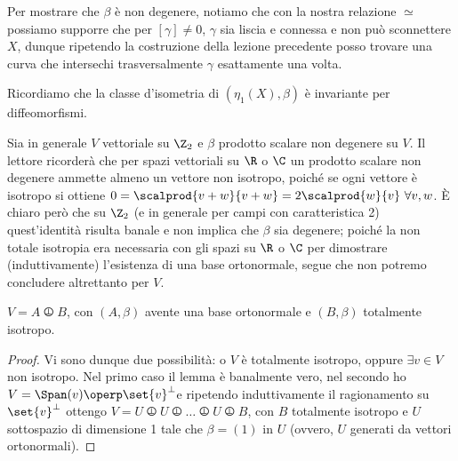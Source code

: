 Per mostrare che $\beta$ è non degenere, notiamo che con la nostra relazione $\simeq$ possiamo supporre che per $[\gamma] \neq 0$, $\gamma$ sia liscia e connessa e non può sconnettere $X$, dunque ripetendo la costruzione della lezione precedente posso trovare una curva che intersechi trasversalmente $\gamma$ esattamente una volta.


Ricordiamo che la classe d'isometria di $(\eta_1(X), \beta)$ è invariante per diffeomorfismi.

Sia in generale $V$ vettoriale su $\Z_2$ e $\beta$ prodotto scalare non degenere su $V$. Il lettore ricorderà che per spazi vettoriali su $\R$ o $\C$ un prodotto scalare non degenere ammette almeno un vettore non isotropo, poiché se ogni vettore è isotropo si ottiene $0 = \scalprod{v+w}{v+w} = 2\scalprod{w}{v} \ \forall v,w$. È chiaro però che su $\Z_2$ (e in generale per campi con caratteristica 2) quest'identità risulta banale e non implica che $\beta$ sia degenere; poiché la non totale isotropia era necessaria con gli spazi su $\R$ o $\C$ per dimostrare (induttivamente) l'esistenza di una base ortonormale, segue che non potremo concludere altrettanto per $V$.

\begin{lemma}[Lemma 1]
	$V = A \operp B$, con $(A, \beta)$ avente una base ortonormale e $(B, \beta)$ totalmente isotropo.
\end{lemma}
\begin{proof}
	Vi sono dunque due possibilità: o $V$ è totalmente isotropo, oppure $\exists v \in V$ non isotropo. Nel primo caso il lemma è banalmente vero, nel secondo ho $V = \Span(v) \operp \set{v}^\perp$\footnotemark e ripetendo induttivamente il ragionamento su $\set{v}^\perp$ ottengo $V = U \operp U \operp \dots \operp U \operp B$, con $B$ totalmente isotropo e $U$ sottospazio di dimensione 1 tale che $\beta = (1)$ in $U$ (ovvero, $U$ generati da vettori ortonormali).
\end{proof}

